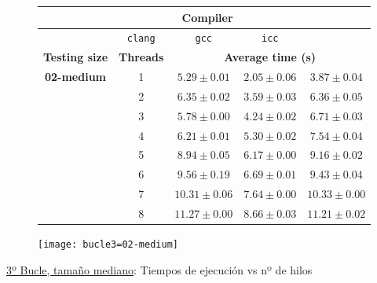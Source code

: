 \begin{figure}[H]
    \centering
    \begin{subfigure}{0.4\textwidth}
        \begin{adjustbox}{width=\textwidth} 
        \begin{tabular}{|c|c|c|c|c|}
            \hline
            \rowcolor{azul} \multicolumn{2}{|c|}{}&\multicolumn{3}{c|}{\textbf{Compiler}} \\ \hline
            \rowcolor{azul} \multicolumn{2}{|c|}{}&\texttt{clang}&\texttt{gcc}&\texttt{icc}\\ \hline
            \rowcolor{azul} \textbf{Testing size} & \textbf{Threads}&\multicolumn{3}{c|}{\textbf{Average time (s)}} \\ \hline
            \multirow{8}{2.5cm}{\textbf{02-medium}} & 1 & \(5.29\pm{0.01}\) & \(2.05\pm{0.06}\) & \(3.87\pm{0.04}\) \\ \cline{2-5}
            & 2 & \(6.35\pm{0.02}\) & \(3.59\pm{0.03}\) & \(6.36\pm{0.05}\) \\ \cline{2-5}
            & 3 & \(5.78\pm{0.00}\) & \(4.24\pm{0.02}\) & \(6.71\pm{0.03}\) \\ \cline{2-5}
            & 4 & \(6.21\pm{0.01}\) & \(5.30\pm{0.02}\) & \(7.54\pm{0.04}\) \\ \cline{2-5}
            & 5 & \(8.94\pm{0.05}\) & \(6.17\pm{0.00}\) & \(9.16\pm{0.02}\) \\ \cline{2-5}
            & 6 & \(9.56\pm{0.19}\) & \(6.69\pm{0.01}\) & \(9.43\pm{0.04}\) \\ \cline{2-5}
            & 7 & \(10.31\pm{0.06}\) & \(7.64\pm{0.00}\) & \(10.33\pm{0.00}\) \\ \cline{2-5}
            & 8 & \(11.27\pm{0.00}\) & \(8.66\pm{0.03}\) & \(11.21\pm{0.02}\) \\ \hline
        \end{tabular}
        \end{adjustbox}
    \end{subfigure}
    \hfill
    \begin{subfigure}{0.5\textwidth}
        \texttt{[image: bucle3=02-medium]}
    \end{subfigure}
    \caption{\underline{3º Bucle, tamaño mediano}: Tiempos de ejecución vs nº de hilos}
    \label{bucle3=02-medium}
\end{figure}

